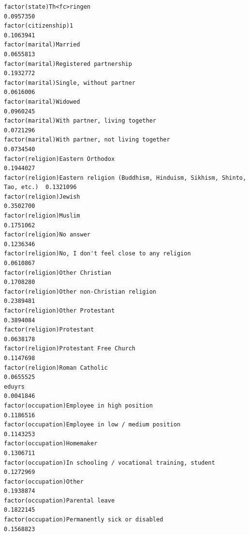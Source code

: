\documentclass[
]{article}
\begin{document}
\begin{table}
\begin{minipage}[t]{\linewidth}
{\begin{verbatim}
factor(state)Th<fc>ringen                                                          0.0957350
factor(citizenship)1                                                               0.1063941
factor(marital)Married                                                             0.0655813
factor(marital)Registered partnership                                              0.1932772
factor(marital)Single, without partner                                             0.0616006
factor(marital)Widowed                                                             0.0960245
factor(marital)With partner, living together                                       0.0721296
factor(marital)With partner, not living together                                   0.0734540
factor(religion)Eastern Orthodox                                                   0.1944027
factor(religion)Eastern religion (Buddhism, Hinduism, Sikhism, Shinto, Tao, etc.)  0.1321096
factor(religion)Jewish                                                             0.3502700
factor(religion)Muslim                                                             0.1751062
factor(religion)No answer                                                          0.1236346
factor(religion)No, I don't feel close to any religion                             0.0610867
factor(religion)Other Christian                                                    0.1708280
factor(religion)Other non-Christian religion                                       0.2389481
factor(religion)Other Protestant                                                   0.3894084
factor(religion)Protestant                                                         0.0638178
factor(religion)Protestant Free Church                                             0.1147698
factor(religion)Roman Catholic                                                     0.0655525
eduyrs                                                                             0.0041846
factor(occupation)Employee in high position                                        0.1186516
factor(occupation)Employee in low / medium position                                0.1143253
factor(occupation)Homemaker                                                        0.1306711
factor(occupation)In schooling / vocational training, student                      0.1272969
factor(occupation)Other                                                            0.1938874
factor(occupation)Parental leave                                                   0.1822145
factor(occupation)Permanently sick or disabled                                     0.1568823

\end{verbatim}}
\end{minipage}
\end{table}
\end{document}
